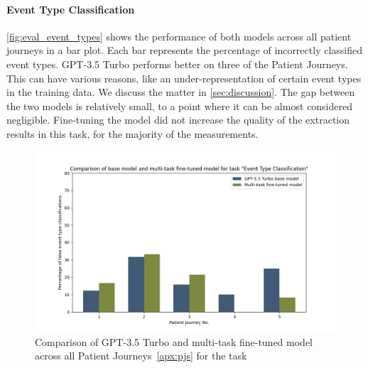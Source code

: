 \paragraph{Event Type Classification} \autoref{fig:eval_event_types} shows the performance of both models across all patient journeys in a bar plot. Each bar represents the percentage of incorrectly classified event types. GPT-3.5 Turbo performs better on three of the Patient Journeys. This can have various reasons, like an under-representation of certain event types in the training data. We discuss the matter in \autoref{sec:discussion}. The gap between the two models is relatively small, to a point where it can be almost considered negligible. Fine-tuning the model did not increase the quality of the extraction results in this task, for the majority of the measurements.
\begin{figure}[ht]
    \centering
    \captionsetup{belowskip=0pt,aboveskip=0pt}
    \includegraphics[width=\textwidth]{bachelor_thesis/images/event_types_all.png}
    \caption{Comparison of GPT-3.5 Turbo and multi-task fine-tuned model across all Patient Journeys~\ref{apx:pjs} for the task }
    \label{fig:eval_event_types}
\end{figure}

\newpage
